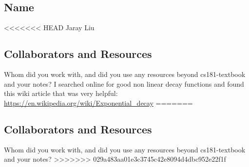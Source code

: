\documentclass[submit]{../harvardml}
\begin{document}
\subsection*{Name}
<<<<<<< HEAD
Jaray Liu
\subsection*{Collaborators and Resources}
Whom did you work with, and did you use any resources beyond cs181-textbook and your notes?
I searched online for good non linear decay functions and found this wiki article that was very helpful:
\url{https://en.wikipedia.org/wiki/Exponential_decay}
=======
\subsection*{Collaborators and Resources}
Whom did you work with, and did you use any resources beyond cs181-textbook and your notes?
>>>>>>> 029a483aa01e3c3745c42e8094d4dbc952e22f1f
\end{document}
